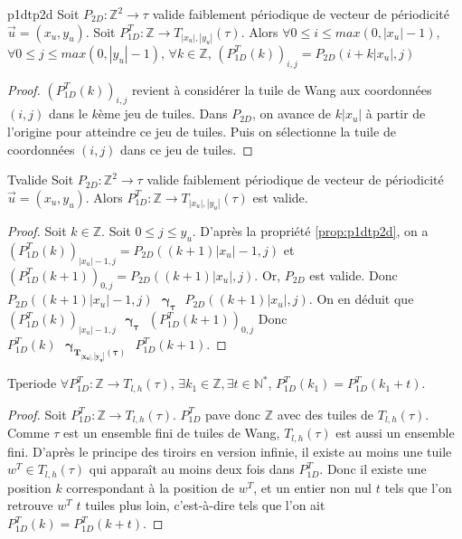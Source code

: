 \documentclass[a4paper,10pt,oneside]{article} %
\begin{document}
\begin{Propriete}{}{p1dtp2d}
Soit $P_{2D} : \mathds{Z}^2 \rightarrow \tau$ valide faiblement périodique de vecteur de périodicité $\Vec{u} = (x_u, y_u)$. Soit $P_{1D}^T : \mathds{Z} \rightarrow T_{|x_u|, |y_u|}(\tau)$. Alors $\forall 0 \leq i \leq max(0, |x_u| - 1)$, $\forall 0 \leq j \leq max(0, |y_u| - 1)$, $\forall k \in \mathds{Z}
$, $(P_{1D}^T(k))_{i,j} = P_{2D}(i + k|x_u|,j)$
\end{Propriete}

\begin{proof}
    $(P_{1D}^T(k))_{i,j}$ revient à considérer la tuile de Wang aux coordonnées $(i,j)$ dans le $k$ème jeu de tuiles. Dans $P_{2D}$, on avance de $k|x_u|$ à partir de l'origine pour atteindre ce jeu de tuiles. Puis on sélectionne la tuile de coordonnées $(i, j)$ dans ce jeu de tuiles.
\end{proof} %

\begin{Lemme}{}{Tvalide}
Soit $P_{2D} : \mathds{Z}^2 \rightarrow \tau$ valide faiblement périodique de vecteur de périodicité $\Vec{u} = (x_u, y_u)$. Alors $P_{1D}^T : \mathds{Z} \rightarrow T_{|x_u|, |y_u|}(\tau)$ est valide.
\end{Lemme}

\begin{proof}
    Soit $k \in \mathds{Z}$.
    Soit $ 0 \leq j \leq y_u$.
    D'après la propriété \ref{prop:p1dtp2d}, on a $(P_{1D}^T(k))_{|x_u|-1, j} = P_{2D}((k+1)|x_u|-1,j)$ et $(P_{1D}^T(k+1))_{0, j} = P_{2D}((k+1)|x_u|,j)$. Or, $P_{2D}$ est valide. Donc $P_{2D}((k+1)|x_u|-1,j) \text{ } \bm{\gamma_{\tau}} \text{ } P_{2D}((k+1)|x_u|,j)$. On en déduit que $(P_{1D}^T(k))_{|x_u|-1, j} \text{ } \bm{\gamma_{\tau}} \text{ } (P_{1D}^T(k+1))_{0, j}$
    Donc $P_{1D}^T(k) \text{ } \bm{\gamma_{T_{|x_u|, |y_u|}(\tau)}} \text{ } P_{1D}^T(k+1)$.
\end{proof}

\begin{Lemme}{}{Tperiode}
$\forall P_{1D}^T : \mathds{Z} \rightarrow T_{l, h}(\tau)$, $\exists k_1 \in \mathds{Z}, \exists t \in \mathds{N}^*$, $P_{1D}^T(k_1) = P_{1D}^T(k_1+t)$. 
\end{Lemme}

\begin{proof}
    Soit $P_{1D}^T : \mathds{Z} \rightarrow T_{l, h}(\tau)$. $P_{1D}^T$ pave donc $\mathds{Z}$ avec des tuiles de $T_{l, h}(\tau)$. Comme $\tau$ est un ensemble fini de tuiles de Wang, $T_{l, h}(\tau)$ est aussi un ensemble fini. D'après le principe des tiroirs en version infinie, il existe au moins une tuile $w^T \in T_{l, h}(\tau)$ qui apparaît au moins deux fois dans $P_{1D}^T$. Donc il existe une position $k$ correspondant à la position de $w^T$, et un entier non nul $t$ tels que l'on retrouve $w^T$ $t$ tuiles plus loin, c'est-à-dire tels que l'on ait $P_{1D}^T(k) = P_{1D}^T(k+t)$.
\end{proof}
\end{document}
